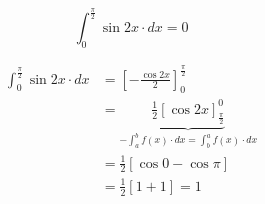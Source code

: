\documentclass[14pt,fleqn]{extarticle}
\newcommand\intg{\int_0^{\frac\pi{2}} \sin 2x\cdot dx }
\begin{document}
 
\begin{snippet}
    
    
    \incorrect
    
    \[ \intg = 0 \]
    \reason
    
    \begin{align}
	\intg &= \left[-\frac{\cos 2x}{2} \right]_0^{\frac\pi{2}} \\
	&= \underbrace{\frac{1}{2} \left[\cos 2x \right]_{\frac\pi{2}}^0 }_{-\int_a^b f(x)\cdot dx = \int_b^a f(x)\cdot dx} \\
	&= \frac{1}{2} \left[\cos 0 - \cos \pi \right] \\
	&= \frac{1}{2} \left[1 + 1 \right] = 1
\end{align}
\end{snippet} 
\end{document}
